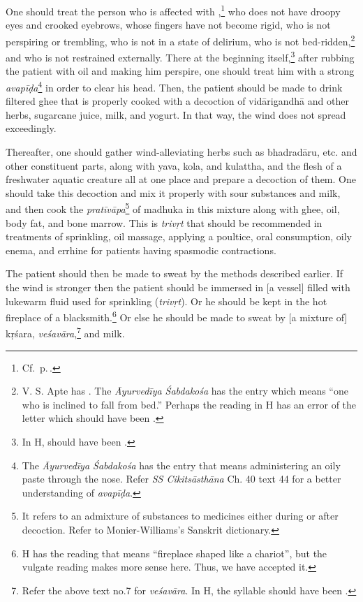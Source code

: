 \begin{translation}
\begin{tt}
One should treat the person who is affected with
,\footnote{Cf.\ p.\,\pageref{apatānaka}.}
    who does not have droopy eyes and crooked eyebrows, whose fingers have
    not become rigid, who is not perspiring or trembling, who is not in a
    state of delirium, who is not bed-ridden,\footnote{V. S. Apte has
        . The \textit{Āyurvedīya \'{S}abdakośa} has the entry
         which means \enquote{one who is inclined to fall
            from bed.} Perhaps the reading in H has an error of the letter
         which should have been .} and who is not restrained
    externally. There at the beginning itself,\footnote{In H,
         should have been .} after rubbing the
        patient with oil and making him perspire, one should treat him with a
        strong \textit{avapīḍa}\footnote{The \textit{Āyurvedīya \'{S}abdakośa}
            has the entry  that means administering an oily paste
            through the nose. Refer \textit{SS Cikitsāsthāna} Ch. 40 text 44 for a
            better understanding of \textit{avapīḍa}.} in order
        to clear his head. Then, the patient should be made to drink filtered
        ghee that is properly cooked with a decoction of \gls{vidārigandhā}
        and other herbs, sugarcane juice, milk, and yogurt. In that way, the
        wind does not spread exceedingly.

Thereafter, one should gather wind-alleviating herbs such as
\gls{bhadradāru}, etc. and other constituent parts, along with
\gls{yava}, \gls{kola}, and \gls{kulattha}, and the flesh of a
freshwater aquatic creature all at one place and prepare a decoction
of them. One should take this decoction and mix it properly with sour
substances and milk, and then cook the \textit{pratīvāpa}\footnote{It
    refers to an admixture of substances to medicines either during or
    after decoction. Refer to Monier-Williams's Sanskrit dictionary.} of
    \gls{madhuka} in this mixture along with ghee, oil, body fat, and bone
    marrow. This is \textit{trivṛt} that should be recommended in
    treatments of sprinkling, oil massage, applying a poultice, oral
    consumption, oily enema, and errhine for patients having spasmodic
    contractions.

The patient should then be made to sweat by the methods described
earlier. If the wind is stronger then the patient should be immersed
in [a vessel] filled with lukewarm fluid used for sprinkling
(\textit{trivṛt}). Or he should be kept in the hot fireplace of a
blacksmith.\footnote{H has the reading  that
    means \enquote{fireplace shaped like a chariot}, but the vulgate
    reading  makes more sense here. Thus, we have
    accepted it.} Or else he should be made to sweat by [a mixture of]
    \gls{kṛśara}, \textit{veśavāra},\footnote{Refer the above text no.7
        for \textit{veśavāra}. In H, the syllable  should have been
        .} and milk.


\end{tt}
\end{translation}
